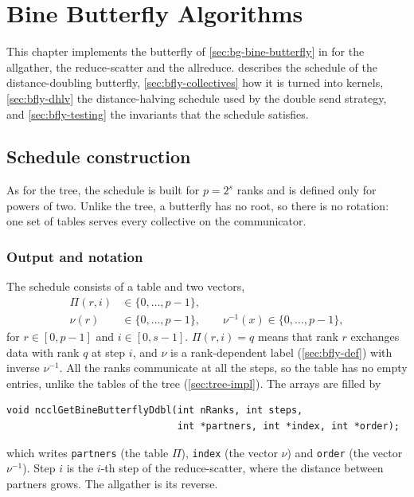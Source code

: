 \chapter{Bine Butterfly Algorithms}\label{ch:butterfly}

\makeatletter
\setlength{\@fptop}{0pt}
\setlength{\@fpsep}{20pt plus 2pt}
\setlength{\@fpbot}{0pt plus 1fil}
\makeatother


This chapter implements the \bine{} butterfly of \cref{sec:bg-bine-butterfly} in \nccl{} for the allgather, the reduce-scatter and the allreduce.
 describes the schedule of the distance-doubling butterfly, \cref{sec:bfly-collectives} how it is turned into kernels, \cref{sec:bfly-dhlv} the distance-halving schedule used by the double send strategy, and \cref{sec:bfly-testing} the invariants that the schedule satisfies.

\section{Schedule construction}\label{sec:bfly-impl}

As for the tree, the schedule is built for $p=2^s$ ranks and is defined only for powers of two.
Unlike the tree, a butterfly has no root, so there is no rotation: one set of tables serves every collective on the communicator.

\subsection{Output and notation}

The schedule consists of a table and two vectors,
\begin{align}
  \Pi(r,i) &\in \{0,\dots,p-1\}, \\
  \nu(r) &\in \{0,\dots,p-1\}, \qquad \nu^{-1}(x)\in\{0,\dots,p-1\},
\end{align}
for $r\in[0,p-1]$ and $i\in[0,s-1]$.
$\Pi(r,i)=q$ means that rank $r$ exchanges data with rank $q$ at step $i$, and $\nu$ is a rank-dependent label (\cref{sec:bfly-def}) with inverse $\nu^{-1}$.
All the ranks communicate at all the steps, so the table has no empty entries, unlike the tables of the tree (\cref{sec:tree-impl}).
The arrays are filled by
\begin{verbatim}
void ncclGetBineButterflyDdbl(int nRanks, int steps,
                              int *partners, int *index, int *order);
\end{verbatim}
which writes \texttt{partners} (the table $\Pi$), \texttt{index} (the vector $\nu$) and \texttt{order} (the vector $\nu^{-1}$).
Step $i$ is the $i$-th step of the reduce-scatter, where the distance between partners grows. The allgather is its reverse.

